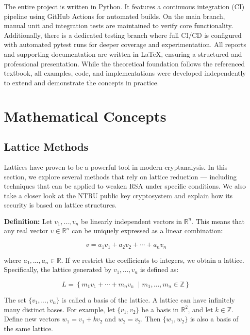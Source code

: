 \documentclass[a4paper,12pt]{article}
\begin{document}
The entire project is written in Python. It features a continuous integration (CI) pipeline using GitHub Actions for automated builds. On the main branch, manual unit and integration tests are maintained to verify core functionality. Additionally, there is a dedicated testing branch where full CI/CD is configured with automated pytest runs for deeper coverage and experimentation. All reports and supporting documentation are written in LaTeX, ensuring a structured and professional presentation. While the theoretical foundation follows the referenced textbook, all examples, code, and implementations were developed independently to extend and demonstrate the concepts in practice.
\newpage
\section{Mathematical Concepts}
\subsection{Lattice Methods}
Lattices have proven to be a powerful tool in modern cryptanalysis.  
In this section, we explore several methods that rely on lattice reduction — including techniques that can be applied to weaken RSA under specific conditions.  
We also take a closer look at the NTRU public key cryptosystem and explain how its security is based on lattice structures.

\textbf{Definition:}
Let \( v_1, \ldots, v_n \) be linearly independent vectors in \( \mathbb{R}^n \).  
This means that any real vector \( v \in \mathbb{R}^n \) can be uniquely expressed as a linear combination:

\[
v = a_1 v_1 + a_2 v_2 + \cdots + a_n v_n
\]

where \( a_1, \ldots, a_n \in \mathbb{R} \).  
If we restrict the coefficients to integers, we obtain a lattice.  
Specifically, the lattice generated by \( v_1, \ldots, v_n \) is defined as:

\[
L = \left\{ m_1 v_1 + \cdots + m_n v_n \,\middle|\, m_1, \ldots, m_n \in \mathbb{Z} \right\}
\]

The set \( \{v_1, \ldots, v_n\} \) is called a basis of the lattice.  
A lattice can have infinitely many distinct bases. For example,  
let \( \{v_1, v_2\} \) be a basis in \( \mathbb{R}^2 \), and let \( k \in \mathbb{Z} \).  
Define new vectors \( w_1 = v_1 + k v_2 \) and \( w_2 = v_2 \).  
Then \( \{w_1, w_2\} \) is also a basis of the same lattice.
\end{document}
